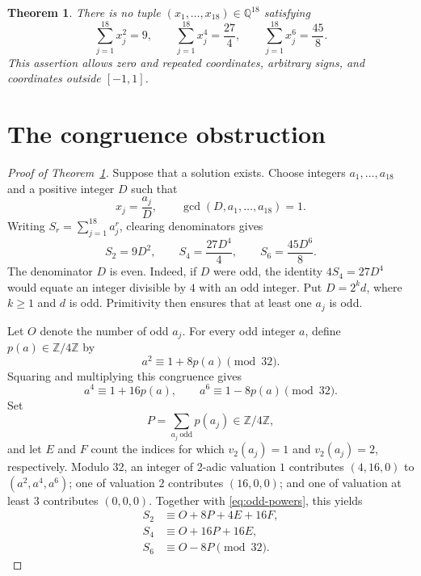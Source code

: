 \documentclass[11pt]{article}
\newtheorem{theorem}{Theorem}
\newcommand{\Q}{\mathbb{Q}}
\begin{document}
\begin{theorem}\label{thm:main}
There is no tuple \((x_1,\ldots,x_{18})\in\Q^{18}\) satisfying
\[
 \sum_{j=1}^{18}x_j^2=9,\qquad
 \sum_{j=1}^{18}x_j^4=\frac{27}{4},\qquad
 \sum_{j=1}^{18}x_j^6=\frac{45}{8}.
\]
This assertion allows zero and repeated coordinates, arbitrary signs, and
coordinates outside \([-1,1]\).
\end{theorem}

\section{The congruence obstruction}

\begin{proof}[Proof of Theorem~\ref{thm:main}]
Suppose that a solution exists.  Choose integers
\(a_1,\ldots,a_{18}\) and a positive integer \(D\) such that
\[
  x_j=\frac{a_j}{D},\qquad
  \gcd(D,a_1,\ldots,a_{18})=1.
\]
Writing \(S_r=\sum_{j=1}^{18}a_j^r\), clearing denominators gives
\begin{equation}\label{eq:cleared}
 S_2=9D^2,\qquad S_4=\frac{27D^4}{4},\qquad
 S_6=\frac{45D^6}{8}.
\end{equation}
The denominator \(D\) is even.  Indeed, if \(D\) were odd, the identity
\(4S_4=27D^4\) would equate an integer divisible by \(4\) with an odd
integer.  Put \(D=2^k d\), where \(k\geq1\) and \(d\) is odd.  Primitivity
then ensures that at least one \(a_j\) is odd.

Let \(O\) denote the number of odd \(a_j\).  For every odd integer \(a\),
define \(p(a)\in\mathbb Z/4\mathbb Z\) by
\[
 a^2\equiv1+8p(a)\pmod {32}.
\]
Squaring and multiplying this congruence gives
\begin{equation}\label{eq:odd-powers}
 a^4\equiv1+16p(a),\qquad
 a^6\equiv1-8p(a)\pmod {32}.
\end{equation}
Set
\[
 P=\sum_{a_j\ \mathrm{odd}}p(a_j)\in\mathbb Z/4\mathbb Z,
\]
and let \(E\) and \(F\) count the indices for which \(v_2(a_j)=1\) and
\(v_2(a_j)=2\), respectively.  Modulo \(32\), an integer of 2-adic
valuation \(1\) contributes \((4,16,0)\) to
\((a^2,a^4,a^6)\); one of valuation \(2\) contributes \((16,0,0)\); and
one of valuation at least \(3\) contributes \((0,0,0)\).  Together with
\eqref{eq:odd-powers}, this yields
\begin{align}
 S_2&\equiv O+8P+4E+16F,\label{eq:s2}\\
 S_4&\equiv O+16P+16E,\label{eq:s4}\\
 S_6&\equiv O-8P\pmod {32}.\label{eq:s6}
\end{align}


\end{proof}
\end{document}
